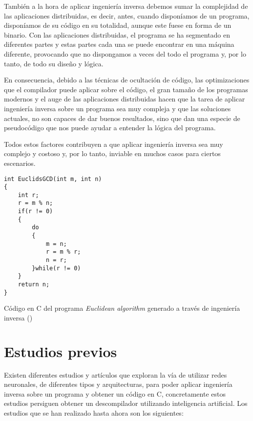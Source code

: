También a la hora de aplicar ingeniería inversa debemos sumar la complejidad de las aplicaciones
distribuidas, es decir, antes, cuando disponíamos de un programa, disponíamos de su código en
su totalidad, aunque este fuese en forma de un binario. Con las aplicaciones distribuidas, el
programa se ha segmentado en diferentes partes y estas partes cada una se puede encontrar en una
máquina diferente, provocando que no dispongamos a veces del todo el programa y, por lo tanto,
de todo su diseño y lógica.

En consecuencia, debido a las técnicas de ocultación de código, las optimizaciones que el compilador
puede aplicar sobre el código, el gran tamaño de los programas modernos y el auge de las aplicaciones
distribuidas hacen que la tarea de aplicar ingeniería inversa sobre un programa sea muy compleja y
que las soluciones actuales, no son capaces de dar buenos resultados, sino que dan una especie de
pseudocódigo que nos puede ayudar a entender la lógica del programa.

Todos estos factores contribuyen a que aplicar ingeniería inversa sea muy complejo y costoso y, por
lo tanto, inviable en muchos casos para ciertos escenarios.

\begin{mycode}
    \begin{verbatim}
int EuclidsGCD(int m, int n)
{
    int r;
    r = m % n;
    if(r != 0) 
    {
        do
        {
            m = n;
            r = m % r;
            n = r;
        }while(r != 0)
    }
    return n;
}
    \end{verbatim}
    \caption[Código en C del programa \textit{Euclidean algorithm} generado a través de ingeniería inversa]{Código en C del programa \textit{Euclidean algorithm} generado a través de ingeniería inversa (\cite{EuclidianCode})}
    \label{cod:EuclidianCodeIng}
\end{mycode}

\section{Estudios previos}
\label{sec:estudios_previos}


Existen diferentes estudios y artículos que exploran la vía de utilizar redes neuronales,
de diferentes tipos y arquitecturas, para poder aplicar ingeniería inversa sobre un programa
y obtener un código en C, concretamente estos estudios persiguen obtener un descompilador utilizando
inteligencia artificial. Los estudios que se han realizado hasta ahora son los siguientes:

